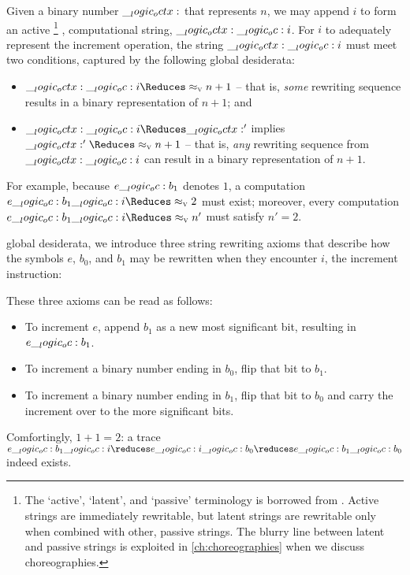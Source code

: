 Given a binary number $\__logic_octx:$ that represents $n$, we may append $i$ to form an active%
\footnote{The \enquote*{active}, \enquote*{latent}, and \enquote*{passive} terminology is borrowed from \textcite{Pfenning+Simmons:LICS09}.
  Active strings are immediately rewritable, but latent strings are rewritable only when combined with other, passive strings.
  The blurry line between latent and passive strings is exploited in \cref{ch:choreographies} when we discuss choreographies.}
, computational string, $\__logic_octx: \__logic_oc: i$.
For $i$ to adequately represent the increment operation, the string $\__logic_octx: \__logic_oc: i$ must meet two conditions, captured by the following global desiderata:
  \begin{itemize}%
  \item
    $\octx \oc i \Reduces\aval{}{n+1}$ -- that is, \emph{some} rewriting sequence results in a binary representation of $n+1$; and
  \item
    $\octx \oc i \Reduces \octx'$ implies $\octx' \Reduces\aval{}{n+1}$ -- that is, \emph{any} rewriting sequence from $\__logic_octx: \__logic_oc: i$ can result in a binary representation of $n+1$.
  \end{itemize}
For example, because $e \__logic_oc: b_1$ denotes $1$, a computation $e \oc b_1 \oc i \Reduces\aval{}{2}$ must exist; moreover, every computation $e \oc b_1 \oc i \Reduces\aval{}{n'}$ must satisfy $n' = 2$.

 global desiderata, we introduce three string rewriting axioms that describe how the symbols $e$, $b_0$, and $b_1$ may be rewritten when they encounter $i$, the increment instruction:
These three axioms can be read as follows:
\begin{itemize}
\item
  To increment $e$, append $b_1$ as a new most significant bit, resulting in $e \__logic_oc: b_1$.
\item
  To increment a binary number ending in $b_0$, flip that bit to $b_1$.
\item
  To increment a binary number ending in $b_1$, flip that bit to $b_0$ and carry the increment over to the more significant bits.
\end{itemize}
Comfortingly, $1+1 = 2$: a trace $e \oc b_1 \oc i \reduces e \oc i \oc b_0 \reduces e \oc b_1 \oc b_0$ indeed exists.

